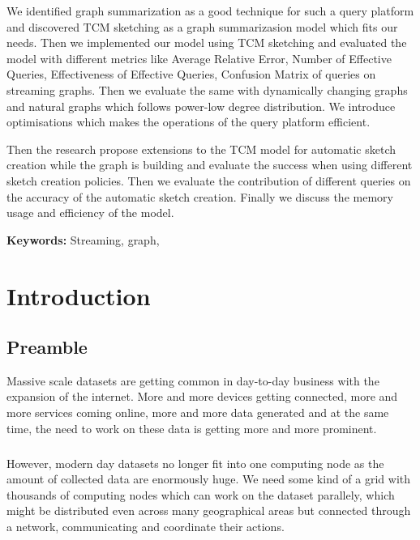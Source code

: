 \documentclass[12pt]{report}
\numberwithin{figure}{section}
\numberwithin{table}{section}
\begin{document}
We identified graph summarization as a good technique for such a query platform and discovered TCM sketching as a graph summarizasion model which fits our needs. Then we implemented our model using TCM sketching and evaluated the model with different metrics like Average Relative Error, Number of Effective Queries, Effectiveness of Effective Queries, Confusion Matrix of queries on streaming graphs. Then we evaluate the same with dynamically changing graphs and natural graphs which follows power-low degree distribution. We introduce optimisations which makes the operations of the query platform efficient.

Then the research propose extensions to the TCM model for automatic sketch creation while the graph is building and evaluate the success when using different sketch creation policies. Then we evaluate the contribution of different queries on the accuracy of the automatic sketch creation. Finally we discuss the memory usage and efficiency of the model. 

\textbf{Keywords:} Streaming, graph,  

\newpage

\listoffigures

\listoftables

\tableofcontents

\newpage
{}



\chapter{Introduction}

\section{Preamble}

Massive scale datasets are getting common in day-to-day business with the expansion of the internet. More and more devices getting connected, more and more services coming online, more and more data generated and at the same time, the need to work on these data is getting more and more prominent.

\paragraph{}

However, modern day datasets no longer fit into one computing node as the amount of collected data are enormously huge.  We need some kind of a grid with thousands of computing nodes which can work on the dataset parallely, which might be distributed even across many geographical areas but connected through a network, communicating and coordinate their actions.
\end{document}
